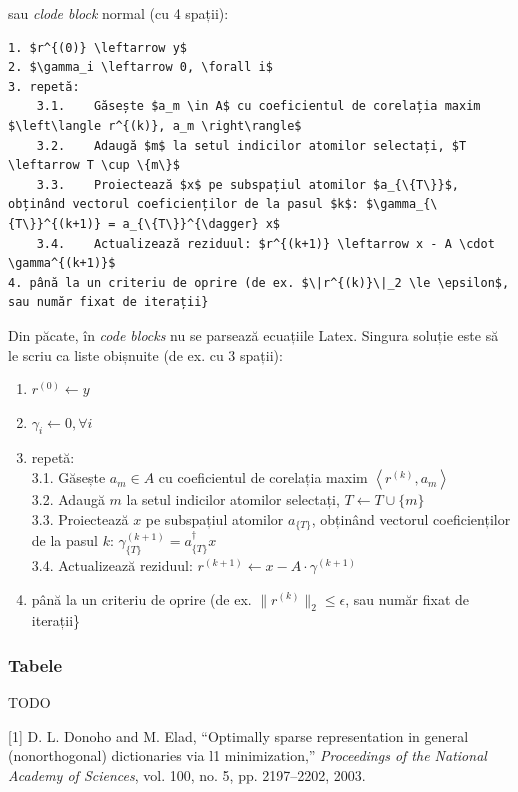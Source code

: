 \documentclass[]{article}
\providecommand{\tightlist}{%
  \setlength{\itemsep}{0pt}\setlength{\parskip}{0pt}}
\begin{document}
sau \emph{clode block} normal (cu 4 spații):

\begin{verbatim}
1. $r^{(0)} \leftarrow y$
2. $\gamma_i \leftarrow 0, \forall i$
3. repetă:  
    3.1.    Găsește $a_m \in A$ cu coeficientul de corelația maxim $\left\langle r^{(k)}, a_m \right\rangle$  
    3.2.    Adaugă $m$ la setul indicilor atomilor selectați, $T \leftarrow T \cup \{m\}$  
    3.3.    Proiectează $x$ pe subspațiul atomilor $a_{\{T\}}$, obținând vectorul coeficienților de la pasul $k$: $\gamma_{\{T\}}^{(k+1)} = a_{\{T\}}^{\dagger} x$  
    3.4.    Actualizează reziduul: $r^{(k+1)} \leftarrow x - A \cdot \gamma^{(k+1)}$
4. până la un criteriu de oprire (de ex. $\|r^{(k)}\|_2 \le \epsilon$, sau număr fixat de iterații}  
\end{verbatim}

Din păcate, în \emph{code blocks} nu se parsează ecuațiile Latex.
Singura soluție este să le scriu ca liste obișnuite (de ex. cu 3
spații):

\begin{enumerate}
\def\labelenumi{\arabic{enumi}.}
\tightlist
\item
  \(r^{(0)} \leftarrow y\)
\item
  \(\gamma_i \leftarrow 0, \forall i\)
\item
  repetă:\\
   3.1. Găsește \(a_m \in A\) cu coeficientul de corelația maxim
  \(\left\langle r^{(k)}, a_m \right\rangle\)\\
   3.2. Adaugă \(m\) la setul indicilor atomilor selectați,
  \(T \leftarrow T \cup \{m\}\)\\
   3.3. Proiectează \(x\) pe subspațiul atomilor \(a_{\{T\}}\), obținând
  vectorul coeficienților de la pasul \(k\):
  \(\gamma_{\{T\}}^{(k+1)} = a_{\{T\}}^{\dagger} x\)\\
   3.4. Actualizează reziduul:
  \(r^{(k+1)} \leftarrow x - A \cdot \gamma^{(k+1)}\)
\item
  până la un criteriu de oprire (de ex. \(\|r^{(k)}\|_2 \le \epsilon\),
  sau număr fixat de iterații\}
\end{enumerate}

\subsubsection{Tabele}\label{tabele}

TODO

\hypertarget{refs}{}
\hypertarget{ref-OptimSpReprDonoho2003}{}
{[}1{]} D. L. Donoho and M. Elad, ``Optimally sparse representation in
general (nonorthogonal) dictionaries via l1 minimization,''
\emph{Proceedings of the National Academy of Sciences}, vol. 100, no. 5,
pp. 2197--2202, 2003.
\end{document}
